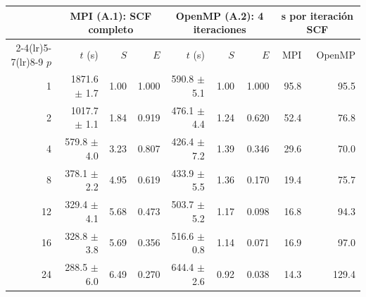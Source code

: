 \begin{tabular}{r rrr rrr rr}
\toprule
 & \multicolumn{3}{c}{MPI (A.1): SCF completo} & \multicolumn{3}{c}{OpenMP (A.2): 4 iteraciones} & \multicolumn{2}{c}{s por iteración SCF} \\
\cmidrule(lr){2-4}\cmidrule(lr){5-7}\cmidrule(lr){8-9}
$p$ & $t$ (s) & $S$ & $E$ & $t$ (s) & $S$ & $E$ & MPI & OpenMP \\
\midrule
1 & 1871.6 $\pm$ 1.7 & 1.00 & 1.000 & 590.8 $\pm$ 5.1 & 1.00 & 1.000 & 95.8 & 95.5 \\
2 & 1017.7 $\pm$ 1.1 & 1.84 & 0.919 & 476.1 $\pm$ 4.4 & 1.24 & 0.620 & 52.4 & 76.8 \\
4 & 579.8 $\pm$ 4.0 & 3.23 & 0.807 & 426.4 $\pm$ 7.2 & 1.39 & 0.346 & 29.6 & 70.0 \\
8 & 378.1 $\pm$ 2.2 & 4.95 & 0.619 & 433.9 $\pm$ 5.5 & 1.36 & 0.170 & 19.4 & 75.7 \\
12 & 329.4 $\pm$ 4.1 & 5.68 & 0.473 & 503.7 $\pm$ 5.2 & 1.17 & 0.098 & 16.8 & 94.3 \\
16 & 328.8 $\pm$ 3.8 & 5.69 & 0.356 & 516.6 $\pm$ 0.8 & 1.14 & 0.071 & 16.9 & 97.0 \\
24 & 288.5 $\pm$ 6.0 & 6.49 & 0.270 & 644.4 $\pm$ 2.6 & 0.92 & 0.038 & 14.3 & 129.4 \\
\bottomrule
\end{tabular}
